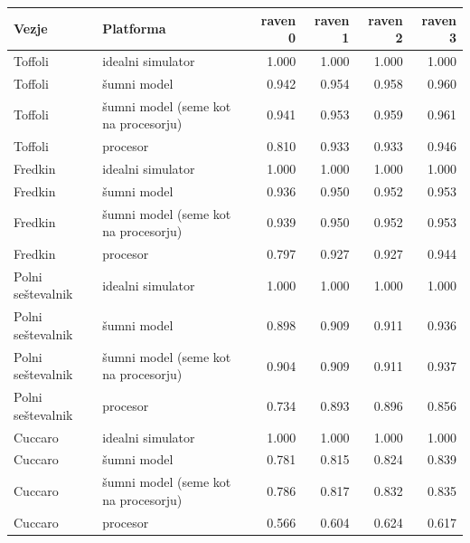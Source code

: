 \begin{tabular}{llrrrr}
\toprule
Vezje & Platforma & raven 0 & raven 1 & raven 2 & raven 3 \\
\midrule
Toffoli & idealni simulator & 1.000 & 1.000 & 1.000 & 1.000 \\
Toffoli & šumni model & 0.942 & 0.954 & 0.958 & 0.960 \\
Toffoli & šumni model (seme kot na procesorju) & 0.941 & 0.953 & 0.959 & 0.961 \\
Toffoli & procesor & 0.810 & 0.933 & 0.933 & 0.946 \\
Fredkin & idealni simulator & 1.000 & 1.000 & 1.000 & 1.000 \\
Fredkin & šumni model & 0.936 & 0.950 & 0.952 & 0.953 \\
Fredkin & šumni model (seme kot na procesorju) & 0.939 & 0.950 & 0.952 & 0.953 \\
Fredkin & procesor & 0.797 & 0.927 & 0.927 & 0.944 \\
Polni seštevalnik & idealni simulator & 1.000 & 1.000 & 1.000 & 1.000 \\
Polni seštevalnik & šumni model & 0.898 & 0.909 & 0.911 & 0.936 \\
Polni seštevalnik & šumni model (seme kot na procesorju) & 0.904 & 0.909 & 0.911 & 0.937 \\
Polni seštevalnik & procesor & 0.734 & 0.893 & 0.896 & 0.856 \\
Cuccaro & idealni simulator & 1.000 & 1.000 & 1.000 & 1.000 \\
Cuccaro & šumni model & 0.781 & 0.815 & 0.824 & 0.839 \\
Cuccaro & šumni model (seme kot na procesorju) & 0.786 & 0.817 & 0.832 & 0.835 \\
Cuccaro & procesor & 0.566 & 0.604 & 0.624 & 0.617 \\
\bottomrule
\end{tabular}
